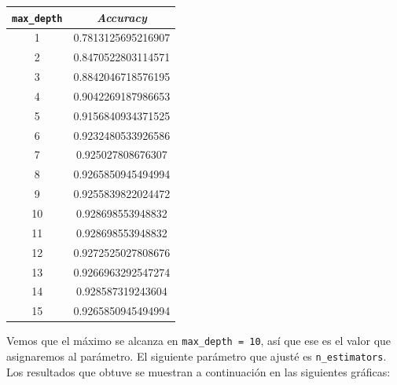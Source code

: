 \documentclass[a4]{article}
\begin{document}
\begin{center}
\begin{tabular}{|c|c|}
\hline
  \multicolumn{1}{|c|}{\texttt{max\_depth}} & \textit{Accuracy}  \\ \hline
  
  1  & 0.7813125695216907 \\
  2  & 0.8470522803114571 \\
  3  & 0.8842046718576195 \\
  4  & 0.9042269187986653 \\
  5  & 0.9156840934371525 \\
  6  & 0.9232480533926586 \\
  7  & 0.925027808676307  \\
  8  & 0.9265850945494994 \\
  9  & 0.9255839822024472 \\
  10 & 0.928698553948832  \\
  11 & 0.928698553948832  \\
  12 & 0.9272525027808676 \\
  13 & 0.9266963292547274 \\
  14 & 0.928587319243604  \\
  15 & 0.9265850945494994 \\ \hline
\end{tabular}
\end{center}

Vemos que el máximo se alcanza en \texttt{max\_depth = 10}, así que ese es el valor que asignaremos al parámetro. El siguiente parámetro que ajusté es \texttt{n\_estimators}. Los resultados que obtuve se muestran a continuación en las siguientes gráficas:

\vspace{-3mm}
\begin{figure}[H]
  \centering
\end{figure}
\end{document}
